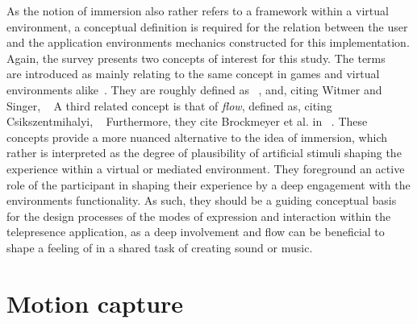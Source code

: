 As the notion of immersion also rather refers to a framework within a virtual environment, a conceptual definition is required for the relation between the user and the application environment\textquotesingle s mechanics constructed for this implementation.
Again, the survey presents two concepts of interest for this study.
The terms ~\parencite[8]{surveyOfPresence} are introduced as mainly relating to the same concept in games and virtual environments alike~\parencite[8]{surveyOfPresence}.
They are roughly defined as ~\parencite[8]{surveyOfPresence}, and, citing Witmer and Singer, ~\parencite[8]{surveyOfPresence}
A third related concept is that of \emph{flow}, defined as, citing Csikszentmihalyi, ~\parencite[9]{surveyOfPresence}
Furthermore, they cite Brockmeyer et al.
in ~\parencite[9]{surveyOfPresence}.
These concepts provide a more nuanced alternative to the idea of immersion, which rather is interpreted as the degree of plausibility of artificial stimuli shaping the experience within a virtual or mediated environment.
They foreground an active role of the participant in shaping their experience by a deep engagement with the environment\textquotesingle s functionality.
As such, they should be a guiding conceptual basis for the design processes of the modes of expression and interaction within the telepresence application, as a deep involvement and flow can be beneficial to shape a feeling of  in a shared task of creating sound or music.

\section{Motion capture}
\label{sec:motion-capture}

